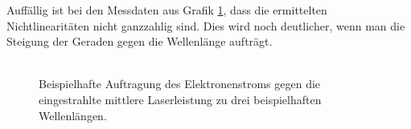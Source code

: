 \documentclass[bachelor,       %
               twoside,        %
               BCOR10mm,       %
               english,ngerman, %
               final,          %
               ]{GAUBM}
\begin{document}
Auffällig ist bei den Messdaten aus Grafik \ref{fig:e}, dass die ermittelten Nichtlinearitäten nicht ganzzahlig sind.
Dies wird noch deutlicher, wenn man die Steigung der Geraden gegen die Wellenlänge aufträgt.\\\\


\begin{figure}[h!]
  \centering
  \hfill
  \hfill
  \caption{Beispielhafte Auftragung des Elektronenstroms gegen die eingestrahlte mittlere Laserleistung zu drei beispielhaften Wellenlängen.}
  \label{fig:e}
\end{figure}
\end{document}
